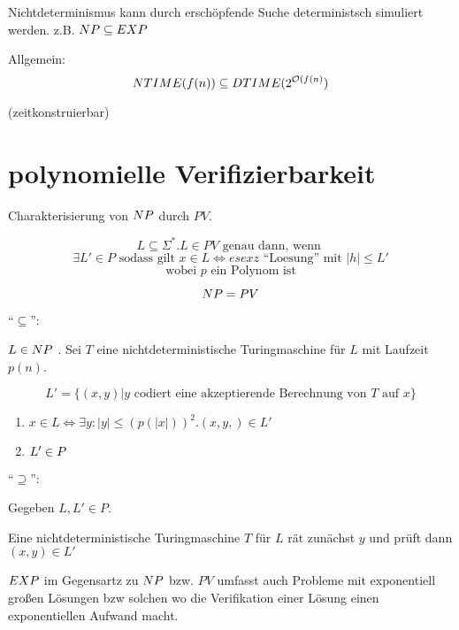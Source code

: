 Nichtdeterminismus kann durch erschöpfende Suche deterministsch simuliert werden.
z.B. $NP \subseteq EXP$


Allgemein:
$$NTIME(f(n)) \subseteq DTIME(2^{\mathcal{O}(f(n)})$$

(zeitkonstruierbar)


\section{polynomielle Verifizierbarkeit}


\begin{definition}
    
    Charakterisierung von $NP$ durch  $PV$.

    $$ L \subseteq \Sigma^\ast . L \in PV \text{ genau dann, wenn } $$
    $$ \exists L' \in P \text { sodass gilt } x \in L \Leftrightarrow  esex z \text{ ``Loesung'' mit } |h| \leq L' $$
    $$ \text{ wobei } p \text{ ein Polynom ist } $$

\end{definition}


\begin{satz}
    $$ NP = PV $$
\end{satz}
\begin{beweis}
    ``$\subseteq$'':

    $L \in NP$ . Sei $T$ eine nichtdeterministische Turingmaschine für $L$ mit Laufzeit $p(n)$.

    $$ L' = \{(x,y) | y \text{ codiert eine akzeptierende Berechnung von } T \text{ auf } x \} $$

    \begin{enumerate}
        \item $x \in L \Leftrightarrow  \exists y: |y| \leq (p(|x|))^2 . (x,y,) \in L'$
        \item $L' \in P$
    \end{enumerate}


    ``$\supseteq$'':

     Gegeben $L, L' \in P$. 

     Eine nichtdeterministische Turingmaschine $T$ für $L$ rät zunächst $y$ und prüft dann $(x,y) \in L'$
\end{beweis}
  

$EXP$ im Gegensartz zu $NP$ bzw. $PV$ umfasst auch Probleme mit exponentiell großen Lösungen bzw solchen wo die Verifikation einer Lösung einen exponentiellen Aufwand macht.






